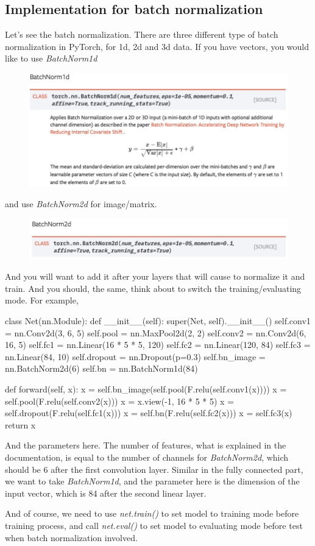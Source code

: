 \subsection{Implementation for batch normalization} 
Let's see the batch normalization. There are three different type of batch normalization in PyTorch, for 1d, 2d and 3d data. If you have vectors, you would like to use \emph{BatchNorm1d}
\begin{figure}[H]
\centering
\includegraphics[scale=0.7]{./figures/497Proj_bn1d}
\end{figure}
and use \emph{BatchNorm2d} for image/matrix. 
\begin{figure}[H]
\centering
\includegraphics[scale=0.7]{./figures/497Proj_bn2d}
\end{figure}
And you will want to add it after your layers that will cause to normalize it and train. And you should, the same, think about to switch the training/evaluating mode. For example,
\begin{python}
class Net(nn.Module):
    def __init__(self):
        super(Net, self).__init__()
        self.conv1 = nn.Conv2d(3, 6, 5)
        self.pool = nn.MaxPool2d(2, 2)
        self.conv2 = nn.Conv2d(6, 16, 5)
        self.fc1 = nn.Linear(16 * 5 * 5, 120)
        self.fc2 = nn.Linear(120, 84)
        self.fc3 = nn.Linear(84, 10)
        self.dropout = nn.Dropout(p=0.3)
        self.bn_image = nn.BatchNorm2d(6)
        self.bn = nn.BatchNorm1d(84)

    def forward(self, x):
        x = self.bn_image(self.pool(F.relu(self.conv1(x))))
        x = self.pool(F.relu(self.conv2(x)))
        x = x.view(-1, 16 * 5 * 5)
        x = self.dropout(F.relu(self.fc1(x)))
        x = self.bn(F.relu(self.fc2(x)))
        x = self.fc3(x)
        return x
\end{python}
And the parameters here. The number of features, what is explained in the documentation, is equal to the number of channels for \emph{BatchNorm2d}, which should be 6 after the first convolution layer. Similar in the fully connected part, we want to take \emph{BatchNorm1d}, and the parameter here is the dimension of the input vector, which is 84 after the second linear layer.

And of course, we need to use \emph{net.train()} to set model to training mode before training process, and call \emph{net.eval()} to set model to evaluating mode before test when batch normalization involved.




